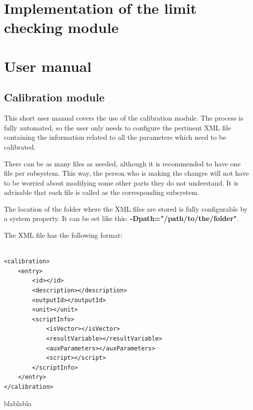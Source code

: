 \section{Implementation of the limit checking module}


\section{User manual}
\subsection{Calibration module}
This short user manual covers the use of the calibration module. The process is fully automated, so the user only needs to configure the pertinent XML file containing the information related to all the parameters which need to be calibrated.

There can be as many files as needed, although it is recommended to have one file per subsystem. This way, the person who is making the changes will not have to be worried about modifying some other parts they do not understand. It is advisable that each file is called as the corresponding subsystem.


The location of the folder where the XML files are stored is fully configurable by a system property. It can be set like this: \textbf{-Dpath="/path/to/the/folder"}.

The XML file has the following format:
\begin{table}[h]
\lstset{language=XML}
\begin{lstlisting}

<calibration>
	<entry>
		<id></id>
		<description></description>
		<outputId></outputId>
		<unit></unit>
		<scriptInfo>
			<isVector></isVector>
			<resultVariable></resultVariable>
			<auxParameters></auxParameters>
			<script></script>
		</scriptInfo>
	</entry>
</calibration>
\end{lstlisting}
\caption{blablabla}
\label{Table5.890}
\end{table}

